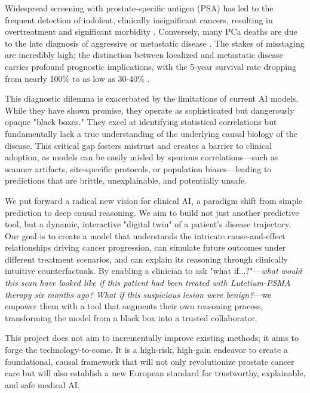 \documentclass[11pt, a4paper]{article}
\begin{document}
Widespread screening with prostate-specific antigen (PSA) has led to the frequent detection of indolent, clinically insignificant cancers, resulting in overtreatment and significant morbidity \cite{PadhaniSchoots2023,JenaTaneja2018,CaraccioloCastello2022}. Conversely, many PCa deaths are due to the late diagnosis of aggressive or metastatic disease \cite{PadhaniSchoots2023}. The stakes of misstaging are incredibly high; the distinction between localized and metastatic disease carries profound prognostic implications, with the 5-year survival rate dropping from nearly 100\% to as low as 30-40\% \cite{WangODwyer2024,CereserEvangelista2023}.

This diagnostic dilemma is exacerbated by the limitations of current AI models. While they have shown promise, they operate as sophisticated but dangerously opaque "black boxes." They excel at identifying statistical correlations but fundamentally lack a true understanding of the underlying causal biology of the disease. This critical gap fosters mistrust and creates a barrier to clinical adoption, as models can be easily misled by spurious correlations—such as scanner artifacts, site-specific protocols, or population biases—leading to predictions that are brittle, unexplainable, and potentially unsafe.

We put forward a radical new vision for clinical AI, a paradigm shift from simple prediction to deep causal reasoning. We aim to build not just another predictive tool, but a dynamic, interactive "digital twin" of a patient's disease trajectory. Our goal is to create a model that understands the intricate cause-and-effect relationships driving cancer progression, can simulate future outcomes under different treatment scenarios, and can explain its reasoning through clinically intuitive counterfactuals. By enabling a clinician to ask "what if...?"—\textit{what would this scan have looked like if this patient had been treated with Lutetium-PSMA therapy six months ago? What if this suspicious lesion were benign?}—we empower them with a tool that augments their own reasoning process, transforming the model from a black box into a trusted collaborator.

This project does not aim to incrementally improve existing methods; it aims to forge the technology-to-come. It is a high-risk, high-gain endeavor to create a foundational, causal framework that will not only revolutionize prostate cancer care but will also establish a new European standard for trustworthy, explainable, and safe medical AI.
\end{document}
